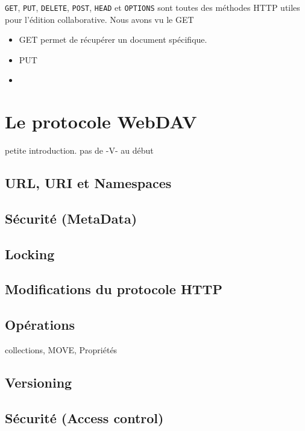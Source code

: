 \documentclass[a4paper, 11pt]{article}
\begin{document}
{		\texttt{GET}, \texttt{PUT}, \texttt{DELETE}, \texttt{POST}, \texttt{HEAD} et \texttt{OPTIONS} sont toutes des méthodes HTTP utiles pour l'édition collaborative. Nous avons vu le GET
		
		\begin{itemize}
			\item GET permet de récupérer un document spécifique. 
			\item PUT %
			\item 
		\end{itemize}
		

\section{Le protocole WebDAV}
\label{sec:proto_webdav}

petite introduction. pas de -V- au début

	\subsection{URL, URI et Namespaces}

	\subsection{Sécurité (MetaData)} 
	
	\subsection{Locking}
	
	\subsection{Modifications du protocole HTTP}
	\label{sub:modif_proto_http}
	
	
	\subsection{Opérations}
	
		collections, MOVE, Propriétés
		
	\subsection{Versioning}
	
	\subsection{Sécurité (Access control)}
	
}
\end{document}

